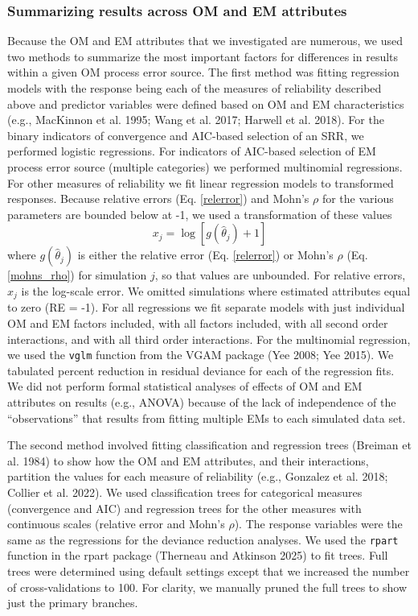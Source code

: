 \documentclass[
  12pt,
]{article}
\begin{document}
\subsubsection*{Summarizing results across OM and EM
attributes}\label{summarizing-results-across-om-and-em-attributes}

Because the OM and EM attributes that we investigated are numerous, we
used two methods to summarize the most important factors for differences
in results within a given OM process error source. The first method was
fitting regression models with the response being each of the measures
of reliability described above and predictor variables were defined
based on OM and EM characteristics (e.g., MacKinnon et al. 1995; Wang et
al. 2017; Harwell et al. 2018). For the binary indicators of convergence
and AIC-based selection of an SRR, we performed logistic regressions.
For indicators of AIC-based selection of EM process error source
(multiple categories) we performed multinomial regressions. For other
measures of reliability we fit linear regression models to transformed
responses. Because relative errors (Eq. \ref{relerror}) and Mohn's
\(\rho\) for the various parameters are bounded below at -1, we used a
transformation of these values
\begin{equation}\label{bias_regression_response}
x_j = \log\left[g\left(\widehat \theta_j\right)+1\right]
\end{equation} where \(g\left(\widehat \theta_j\right)\) is either the
relative error (Eq. \ref{relerror}) or Mohn's \(\rho\) (Eq.
\ref{mohns_rho}) for simulation \(j\), so that values are unbounded. For
relative errors, \(x_j\) is the log-scale error. We omitted simulations
where estimated attributes equal to zero (RE = -1). For all regressions
we fit separate models with just individual OM and EM factors included,
with all factors included, with all second order interactions, and with
all third order interactions. For the multinomial regression, we used
the \verb|vglm| function from the VGAM package (Yee 2008; Yee 2015). We
tabulated percent reduction in residual deviance for each of the
regression fits. We did not perform formal statistical analyses of
effects of OM and EM attributes on results (e.g., ANOVA) because of the
lack of independence of the ``observations'' that results from fitting
multiple EMs to each simulated data set.

The second method involved fitting classification and regression trees
(Breiman et al. 1984) to show how the OM and EM attributes, and their
interactions, partition the values for each measure of reliability
(e.g., Gonzalez et al. 2018; Collier et al. 2022). We used
classification trees for categorical measures (convergence and AIC) and
regression trees for the other measures with continuous scales (relative
error and Mohn's \(\rho\)). The response variables were the same as the
regressions for the deviance reduction analyses. We used the
\verb|rpart| function in the rpart package (Therneau and Atkinson 2025)
to fit trees. Full trees were determined using default settings except
that we increased the number of cross-validations to 100. For clarity,
we manually pruned the full trees to show just the primary branches.
\end{document}
